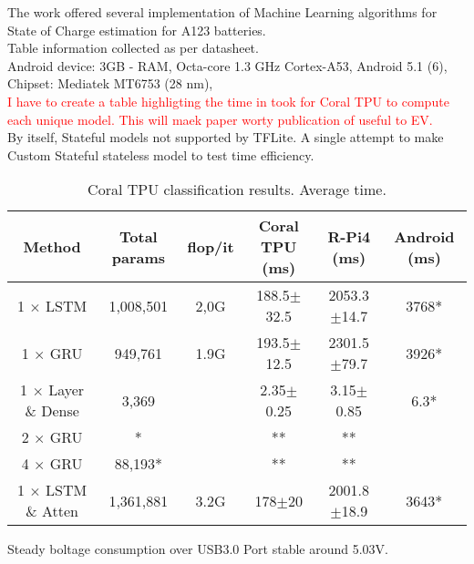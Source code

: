 The work offered several implementation of Machine Learning algorithms for State of Charge estimation for A123 batteries. \\

Table information collected as per datasheet. \\

Android device: 3GB - RAM, Octa-core 1.3 GHz Cortex-A53, Android 5.1 (6), Chipset: Mediatek MT6753 (28 nm), \\




\textcolor{red}{I have to create a table highligting the time in took for Coral TPU to compute each unique model. This will maek paper worty publication of useful to EV.} \\
By itself, Stateful models not supported by TFLite. A single attempt to make Custom Stateful stateless model to test time efficiency.
\begin{table}[ht]
    \centering
    \caption{Coral TPU classification results. Average time.}
    \label{tab:speed}
    \begin{tabular}{c|c|c||c|c|c}
        Method                   &Total params& flop/it & Coral TPU (ms) & R-Pi4 (ms)      & Android (ms) \\
        \hline
        1 $\times$ LSTM          & 1,008,501  & 2,0G & 188.5$\pm$32.5 & 2053.3$\pm$14.7 & 3768*\\
        \hline
        1 $\times$ GRU           & 949,761    & 1.9G & 193.5$\pm$12.5 & 2301.5$\pm$79.7& 3926* \\
        \hline
        1 $\times$ Layer \& Dense& 3,369      &     & 2.35$\pm$0.25  & 3.15$\pm$0.85 & 6.3*\\
        \hline
        2 $\times$ GRU           & *          &     & ** & ** & \\
        \hline
        4 $\times$ GRU           & 88,193*    &     & ** & ** & \\
        \hline
        1 $\times$ LSTM \& Atten & 1,361,881  & 3.2G & 178$\pm$20     & 2001.8$\pm$18.9& 3643* \\
    \end{tabular}
\end{table}
Steady boltage consumption over USB3.0 Port stable around 5.03V. %


